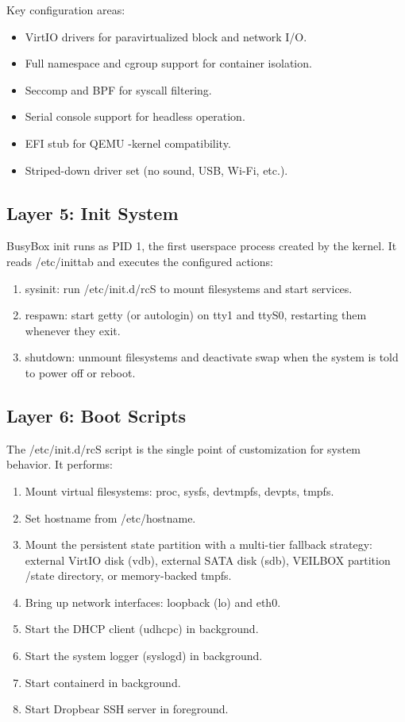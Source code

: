Key configuration areas:
\begin{itemize}[nosep]
  \item VirtIO drivers for paravirtualized block and network I/O.
  \item Full namespace and cgroup support for container isolation.
  \item Seccomp and BPF for syscall filtering.
  \item Serial console support for headless operation.
  \item EFI stub for QEMU -kernel compatibility.
  \item Striped-down driver set (no sound, USB, Wi-Fi, etc.).
\end{itemize}

\subsection{Layer 5: Init System}

BusyBox init runs as PID 1, the first userspace process created by the
kernel. It reads /etc/inittab and executes the configured actions:

\begin{enumerate}[nosep]
  \item sysinit: run /etc/init.d/rcS to mount filesystems and start services.
  \item respawn: start getty (or autologin) on tty1 and ttyS0, restarting
        them whenever they exit.
  \item shutdown: unmount filesystems and deactivate swap when the system
        is told to power off or reboot.
\end{enumerate}

\subsection{Layer 6: Boot Scripts}

The /etc/init.d/rcS script is the single point of customization for system
behavior. It performs:

\begin{enumerate}[nosep]
  \item Mount virtual filesystems: proc, sysfs, devtmpfs, devpts, tmpfs.
  \item Set hostname from /etc/hostname.
  \item Mount the persistent state partition with a multi-tier fallback
        strategy: external VirtIO disk (vdb), external SATA disk (sdb),
        VEILBOX partition /state directory, or memory-backed tmpfs.
  \item Bring up network interfaces: loopback (lo) and eth0.
  \item Start the DHCP client (udhcpc) in background.
  \item Start the system logger (syslogd) in background.
  \item Start containerd in background.
  \item Start Dropbear SSH server in foreground.
\end{enumerate}

